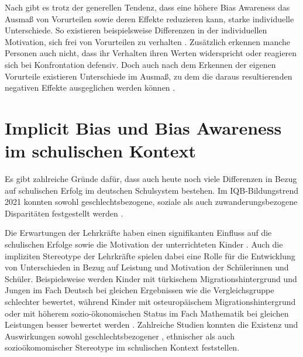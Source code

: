 Nach \citet{perry2015modern} gibt es trotz der generellen Tendenz, dass eine höhere Bias Awareness das Ausmaß von Vorurteilen sowie deren Effekte reduzieren kann, starke individuelle Unterschiede.
So existieren beispielsweise Differenzen in der individuellen Motivation, sich frei von Vorurteilen zu verhalten \citep{devine2002regulation, plant1998internal}.
Zusätzlich erkennen manche Personen auch nicht, dass ihr Verhalten ihren Werten widerspricht \citep{monteith1998proneness} oder reagieren sich bei Konfrontation defensiv.
Doch auch nach dem Erkennen der eigenen Vorurteile existieren Unterschiede im Ausmaß, zu dem die daraus resultierenden negativen Effekte ausgeglichen werden können \citep{moskowitz2011egalitarian}.


\section{Implicit Bias und Bias Awareness im schulischen Kontext}
\label{sec:biases-schule}

Es gibt zahlreiche Gründe dafür, dass auch heute noch viele Differenzen in Bezug auf schulischen Erfolg im deutschen Schulsystem bestehen.
Im IQB-Bildungstrend 2021 konnten sowohl geschlechtsbezogene, soziale als auch zuwanderungsbezogene Disparitäten festgestellt werden \citep{iqb2021bildungstrend}.

Die Erwartungen der Lehrkräfte haben einen signifikanten Einfluss auf die schulischen Erfolge sowie die Motivation der unterrichteten Kinder \citep{gentrup2020self}.
Auch die impliziten Stereotype der Lehrkräfte spielen dabei eine Rolle für die Entwicklung von Unterschieden in Bezug auf Leistung und Motivation der Schülerinnen und Schüler.
Beispielsweise werden Kinder mit türkischem Migrationshintergrund und Jungen im Fach Deutsch bei gleichen Ergebnissen wie die Vergleichsgruppe schlechter bewertet, während Kinder mit osteuropäischem Migrationshintergrund oder mit höherem sozio-ökonomischen Status im Fach Mathematik bei gleichen Leistungen besser bewertet werden \citep{lorenz2016stereotype}.
Zahlreiche Studien konnten die Existenz und Auswirkungen sowohl geschlechtsbezogener \citep{keller2003stereotype, hermann2020maedchen, muntoni2020geschlechterstereotype}, ethnischer \citep{steele1995stereotype, glock2015preservice, glock2017bad, glock2019studies, costa2023does} als auch sozioökomomischer Stereotype \citep{tobisch2017negatively, kleen2020sag} im schulischen Kontext feststellen.

